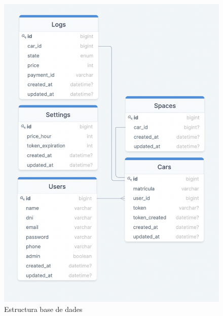 \begin{figure}[H]
\begin{center}
    \includegraphics[scale=0.45]{Fotos/BD.png}
\end{center}
\caption{Estructura base de dades}
\end{figure}

